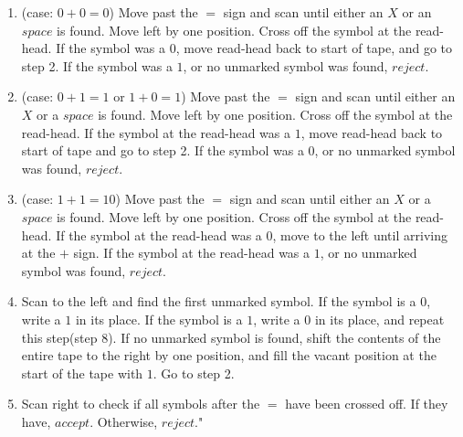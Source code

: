 \documentclass{article}
\begin{document}
\begin{enumerate}[\indent a)]
\begin{enumerate}[\indent 1.]
		\item (case: $0 + 0 = 0$) Move past the $=$ sign and scan until either an $X$ or an $space$ is found. Move left by one position. Cross off the symbol at the read-head. If the symbol was a $0$, move read-head back to start of tape, and go to step 2. If the symbol was a $1$, or no unmarked symbol was found, $reject$.
		
		\item (case: $0 + 1 = 1$ or $1 + 0 = 1$) Move past the $=$ sign and scan until either an $X$ or a $space$ is found. Move left by one position. Cross off the symbol at the read-head. If the symbol at the read-head was a $1$, move read-head back to start of tape and go to step 2. If the symbol was a $0$, or no unmarked symbol was found, $reject$.
		
		\item (case: $1 + 1 = 10$) Move past the $=$ sign and scan until either an $X$ or a $space$ is found. Move left by one position. Cross off the symbol at the read-head. If the symbol at the read-head was a $0$, move to the left until arriving at the $+$ sign. If the symbol at the read-head was a $1$, or no unmarked symbol was found, $reject$.
		
		\item Scan to the left and find the first unmarked symbol. If the symbol is a $0$, write a $1$ in its place. If the symbol is a $1$, write a $0$ in its place, and repeat this step(step 8). If no unmarked symbol is found, shift the contents of the entire tape to the right by one position, and fill the vacant position at the start of the tape with $1$. Go to step 2.
		
		\item Scan right to check if all symbols after the $=$ have been crossed off. If they have, $accept$. Otherwise, $reject$."
		 		
    \end{enumerate}



\end{enumerate}
\end{document}
